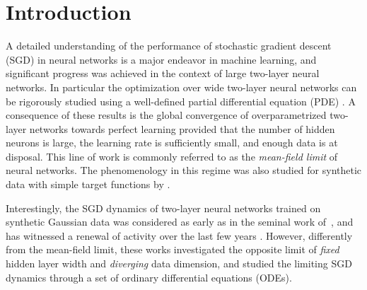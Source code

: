 \section{Introduction}

\label{2302:sec:intro}
A detailed understanding of the performance of stochastic gradient descent (SGD) in neural networks is a major endeavor in machine learning, and  significant progress was achieved in the context of large two-layer neural networks. In particular the optimization over wide two-layer neural networks can be rigorously studied using a well-defined partial differential equation (PDE) \citep{mei2018mean,chizat2018global,rotskoff2022trainability,sirignano2020mean}. A consequence of these results is the global convergence of overparametrized two-layer networks towards perfect learning provided that the number of hidden neurons is large, the learning rate is sufficiently small, and enough data is at disposal. This line of work is commonly referred to as the \emph{mean-field limit} of neural networks. The phenomenology in this regime was also studied for synthetic data with simple target functions by \cite{mei2019mean,abbe2022merged}.

Interestingly, the SGD dynamics of two-layer neural networks trained on synthetic Gaussian data was considered as early as in the seminal work of~\cite{saad1995line,saad1995exact,saad1996dynamics}, and has witnessed a renewal of activity over the last few years \citep{vershynin2018high,goldt2019dynamics,veiga2022phase,arous2022high}. However, differently from the mean-field limit, these works investigated the opposite limit of \emph{fixed} hidden layer width and \emph{diverging} data dimension, and studied the limiting SGD dynamics through a set of ordinary differential equations (ODEs).

